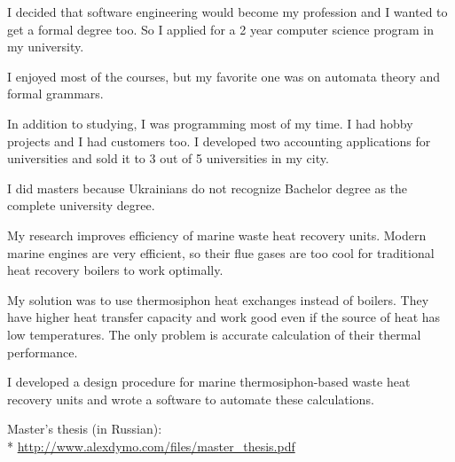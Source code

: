 \documentclass[12pt]{letter}
\begin{document}
\begin{llist}
  \startexperience

            \item I decided that software engineering would become my profession and I wanted to get a formal degree too. So I applied for a 2 year computer science program in my university.

            \item I enjoyed most of the courses, but my favorite one was on automata theory and formal grammars.

            \item In addition to studying, I was programming most of my time. I had hobby projects and I had customers too. I developed two accounting applications for universities and sold it to 3 out of 5 universities in my city.

  \endexperience


  \startexperience

            \item I did masters because Ukrainians do not recognize Bachelor degree as the complete university degree.

            \item My research improves efficiency of marine waste heat recovery units. Modern marine engines are very efficient, so their flue gases are too cool for traditional heat recovery boilers to work optimally.

            \item My solution was to use thermosiphon heat exchanges instead of boilers. They have higher heat transfer capacity and work good even if the source of heat has low temperatures. The only problem is accurate calculation of their thermal performance.

            \item I developed a design procedure for marine thermosiphon-based waste heat recovery units and wrote a software to automate these calculations.

            \item Master's thesis (in Russian):\\*
            \url{http://www.alexdymo.com/files/master_thesis.pdf}

  \endexperience



\end{llist}
\end{document}
